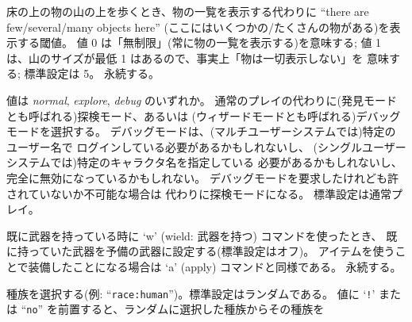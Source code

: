 床の上の物の山の上を歩くとき、物の一覧を表示する代わりに
``there are few/several/many objects here''
(ここにはいくつかの/たくさんの物がある)を表示する閾値。
値 0 は「無制限」(常に物の一覧を表示する)を意味する;
値 1 は、山のサイズが最低 1 はあるので、事実上「物は一切表示しない」を
意味する; 標準設定は 5。
永続する。
\item[\ib{playmode}]
値は {\it normal\/}, {\it explore\/}, {\it debug\/} のいずれか。
通常のプレイの代わりに(発見モードとも呼ばれる)探検モード、あるいは
(ウィザードモードとも呼ばれる)デバッグモードを選択する。
デバッグモードは、(マルチユーザーシステムでは)特定のユーザー名で
ログインしている必要があるかもしれないし、
(シングルユーザーシステムでは)特定のキャラクタ名を指定している
必要があるかもしれないし、
完全に無効になっているかもしれない。
デバッグモードを要求したけれども許されていないか不可能な場合は
代わりに探検モードになる。
標準設定は通常プレイ。
\item[\ib{pushweapon}]
既に武器を持っている時に `w' (wield: 武器を持つ) コマンドを使ったとき、
既に持っていた武器を予備の武器に設定する(標準設定はオフ)。
アイテムを使うことで装備したことになる場合は
`a' (apply) コマンドと同様である。
永続する。
\item[\ib{race}]
種族を選択する(例: ``{\tt race:human}'')。標準設定はランダムである。
値に `{\tt !}' または ``{\tt no}'' を前置すると、ランダムに選択した種族からその種族を
